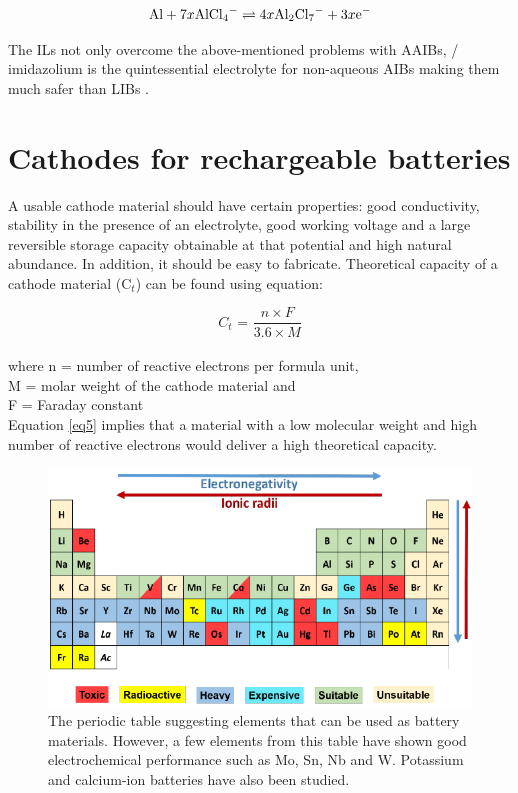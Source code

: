 \begin{align*}
        \ce{Al} + 7x\ce{AlCl4-} \rightleftharpoons 4x\ce{Al2Cl7-} + 3x\ce{e-}
\end{align*}

The ILs not only overcome the above-mentioned problems with AAIBs, / imidazolium is the quintessential electrolyte for non-aqueous AIBs making them much safer than LIBs \cite{jayaprakash_rechargeable_2011, lin_ultrafast_2015,wang_new_2013-1,rani_fluorinated_2013}. 

\section{Cathodes for rechargeable batteries}
A usable cathode material should have certain properties: good conductivity, stability in the presence of an electrolyte, good working voltage and a large reversible storage capacity obtainable at that potential and high natural abundance. In addition, it should be easy to fabricate. Theoretical capacity of a cathode material (C$_{t}$) can be found using equation:

\begin{equation} \label{eq5}
   C_{t} \text{ = } \frac{n \times F}{3.6 \times M}
\end{equation}\\
where n = number of reactive electrons per formula unit,\\
M = molar weight of the cathode material and\\
F = Faraday constant\\
Equation \ref{eq5} implies that a material with a low molecular weight and high number of reactive electrons would deliver a high theoretical capacity.

\begin{figure}[h!]
\centering
\includegraphics[width=\textwidth]{Figures/chap1fig/pertab.pdf}
\caption{The periodic table suggesting elements that can be used as battery materials. However, a few elements from this table have shown good electrochemical performance such as Mo, Sn, Nb and W. Potassium and calcium-ion batteries have also been studied.}
\label{Figures/chap1fig:pertab}
\end{figure}

